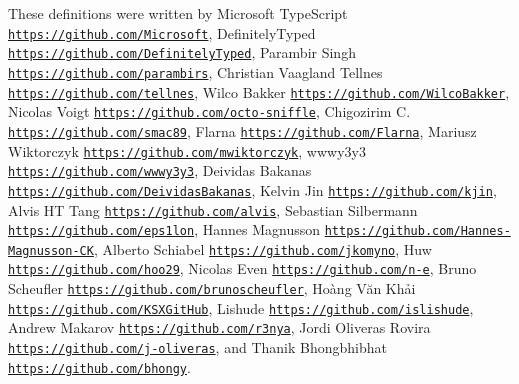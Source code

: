 These definitions were written by Microsoft Type\+Script \href{https://github.com/Microsoft}{\tt https\+://github.\+com/\+Microsoft}, Definitely\+Typed \href{https://github.com/DefinitelyTyped}{\tt https\+://github.\+com/\+Definitely\+Typed}, Parambir Singh \href{https://github.com/parambirs}{\tt https\+://github.\+com/parambirs}, Christian Vaagland Tellnes \href{https://github.com/tellnes}{\tt https\+://github.\+com/tellnes}, Wilco Bakker \href{https://github.com/WilcoBakker}{\tt https\+://github.\+com/\+Wilco\+Bakker}, Nicolas Voigt \href{https://github.com/octo-sniffle}{\tt https\+://github.\+com/octo-\/sniffle}, Chigozirim C. \href{https://github.com/smac89}{\tt https\+://github.\+com/smac89}, Flarna \href{https://github.com/Flarna}{\tt https\+://github.\+com/\+Flarna}, Mariusz Wiktorczyk \href{https://github.com/mwiktorczyk}{\tt https\+://github.\+com/mwiktorczyk}, wwwy3y3 \href{https://github.com/wwwy3y3}{\tt https\+://github.\+com/wwwy3y3}, Deividas Bakanas \href{https://github.com/DeividasBakanas}{\tt https\+://github.\+com/\+Deividas\+Bakanas}, Kelvin Jin \href{https://github.com/kjin}{\tt https\+://github.\+com/kjin}, Alvis HT Tang \href{https://github.com/alvis}{\tt https\+://github.\+com/alvis}, Sebastian Silbermann \href{https://github.com/eps1lon}{\tt https\+://github.\+com/eps1lon}, Hannes Magnusson \href{https://github.com/Hannes-Magnusson-CK}{\tt https\+://github.\+com/\+Hannes-\/\+Magnusson-\/\+CK}, Alberto Schiabel \href{https://github.com/jkomyno}{\tt https\+://github.\+com/jkomyno}, Huw \href{https://github.com/hoo29}{\tt https\+://github.\+com/hoo29}, Nicolas Even \href{https://github.com/n-e}{\tt https\+://github.\+com/n-\/e}, Bruno Scheufler \href{https://github.com/brunoscheufler}{\tt https\+://github.\+com/brunoscheufler}, Hoàng Văn Khải \href{https://github.com/KSXGitHub}{\tt https\+://github.\+com/\+K\+S\+X\+Git\+Hub}, Lishude \href{https://github.com/islishude}{\tt https\+://github.\+com/islishude}, Andrew Makarov \href{https://github.com/r3nya}{\tt https\+://github.\+com/r3nya}, Jordi Oliveras Rovira \href{https://github.com/j-oliveras}{\tt https\+://github.\+com/j-\/oliveras}, and Thanik Bhongbhibhat \href{https://github.com/bhongy}{\tt https\+://github.\+com/bhongy}. 